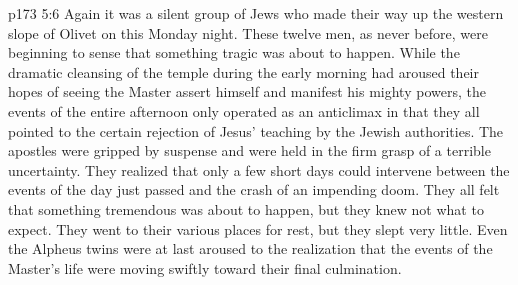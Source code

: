 \vs p173 5:6 Again it was a silent group of Jews who made their way up the western slope of Olivet on this Monday night. These twelve men, as never before, were beginning to sense that something tragic was about to happen. While the dramatic cleansing of the temple during the early morning had aroused their hopes of seeing the Master assert himself and manifest his mighty powers, the events of the entire afternoon only operated as an anticlimax in that they all pointed to the certain rejection of Jesus’ teaching by the Jewish authorities. The apostles were gripped by suspense and were held in the firm grasp of a terrible uncertainty. They realized that only a few short days could intervene between the events of the day just passed and the crash of an impending doom. They all felt that something tremendous was about to happen, but they knew not what to expect. They went to their various places for rest, but they slept very little. Even the Alpheus twins were at last aroused to the realization that the events of the Master’s life were moving swiftly toward their final culmination.\plusone

